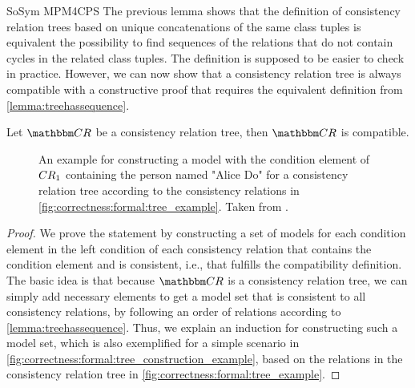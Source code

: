 \begin{copiedFrom}{SoSym MPM4CPS}
The previous lemma shows that the definition of consistency relation trees based on unique concatenations of the same class tuples is equivalent the possibility to find sequences of the relations that do not contain cycles in the related class tuples. %
The definition is supposed to be easier to check in practice.
However, we can now show that a consistency relation tree is always compatible with a constructive proof that requires the equivalent definition from \autoref{lemma:treehassequence}.


\begin{theorem} \label{theorem:treecompatibility}
    Let $\consistencyrelationset{CR}$ be a consistency relation tree, then $\consistencyrelationset{CR}$ is compatible.
\end{theorem}

\begin{figure}
    \centering
    
    \caption[Construction of a model set for a consistency relation tree]{An example for constructing a model with the condition element of $CR_{1}$ containing the person named "Alice Do" for a consistency relation tree according to the consistency relations in \autoref{fig:correctness:formal:tree_example}. Taken from .}
    \label{fig:correctness:formal:tree_construction_example}
\end{figure}

\begin{proof}
    We prove the statement by constructing a set of models for each condition element in the left condition of each consistency relation that contains the condition element and is consistent, i.e., that fulfills the compatibility definition.
    The basic idea is that because $\consistencyrelationset{CR}$ is a consistency relation tree, we can simply add necessary elements to get a model set that is consistent to all consistency relations, by %
    following an order of relations according to \autoref{lemma:treehassequence}.
    Thus, we explain an induction for constructing such a model set, which is also exemplified for a simple scenario in \autoref{fig:correctness:formal:tree_construction_example}, based on the relations in the consistency relation tree in \autoref{fig:correctness:formal:tree_example}.
    

\end{proof}
\end{copiedFrom}
